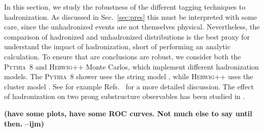 \documentclass[11pt,letterpaper]{article}
\newcommand{\pythia}{\textsc{Pythia~8}\xspace}
\newcommand{\herwig}{\textsc{Herwig++}\xspace}
\DeclareRobustCommand{\Sec}[1]{Sec.~\ref{#1}}
\DeclareRobustCommand{\Refs}[1]{Refs.~\cite{#1}}
\newcommand{\ijm}[1]{\textbf{\textcolor{llblue}{(#1 --ijm)}}}
\begin{document}
\begin{figure}
\begin{center}
\qquad
{}
\end{center}
\caption{ 
}
\label{fig:UE}
\end{figure}

In this section, we study the robustness of the different tagging techniques to hadronization.
%
As discussed in \Sec{sec:pres} this must be interpreted with some care, since the unhadronized events are not themselves physical.
%
Nevertheless, the comparison of hadronized and unhadronized distributions is the best proxy for understand the impact of hadronization, short of performing an analytic calculation.
%
To ensure that are conclusions are robust, we consider both the \pythia and \herwig Monte Carlos, which implement different hadronization models.
%
The \pythia shower uses the string model \cite{Andersson:1983ia,Andersson:1998tv}, while \herwig uses the cluster model \cite{Webber:1983if,Marchesini:1987cf}.
%
See for example \Refs{Buckley:2011ms,Skands:2011pf,Skands:2012ts} for a more detailed discussion.
%
The effect of hadronization on two prong substructure observables has been studied in \cite{Larkoski:2015kga,Salam:2016yht}.


\ijm{have some plots, have some ROC curves. Not much else to say until then.}
\end{document}
